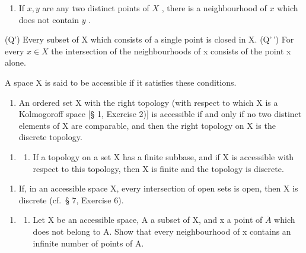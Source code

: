 \begin{enumerate}
\def\labelenumi{(\Alph{enumi})}
\setcounter{enumi}{16}
\tightlist
\item
  If \(x, y\) are any two distinct points of \(X\) , there is a neighbourhood of \(x\) which does not contain \(y\) .
\end{enumerate}

(Q') Every subset of X which consists of a single point is closed in X. (Q'\,') For every \(x \in X\) the intersection of the neighbourhoods of x consists of the point x alone.

A space X is said to be accessible if it satisfies these conditions.

\begin{enumerate}
\def\labelenumi{\alph{enumi})}
\setcounter{enumi}{1}
\tightlist
\item
  An ordered set X with the right topology (with respect to which X is a Kolmogoroff space {[}§ 1, Exercise 2){]} is accessible if and only if no two distinct elements of X are comparable, and then the right topology on X is the discrete topology.
\end{enumerate}

\begin{enumerate}
\def\labelenumi{\arabic{enumi})}
\setcounter{enumi}{1}
\tightlist
\item
  \begin{enumerate}
  \def\labelenumii{\alph{enumii})}
  \tightlist
  \item
    If a topology on a set X has a finite subbase, and if X is accessible with respect to this topology, then X is finite and the topology is discrete.
  \end{enumerate}
\end{enumerate}

\begin{enumerate}
\def\labelenumi{\alph{enumi})}
\setcounter{enumi}{1}
\tightlist
\item
  If, in an accessible space X, every intersection of open sets is open, then X is discrete (cf.~§ 7, Exercise 6).
\end{enumerate}

\begin{enumerate}
\def\labelenumi{\arabic{enumi})}
\setcounter{enumi}{2}
\tightlist
\item
  \begin{enumerate}
  \def\labelenumii{\alph{enumii})}
  \tightlist
  \item
    Let X be an accessible space, A a subset of X, and x a point of \(\overline{A}\) which does not belong to A. Show that every neighbourhood of x contains an infinite number of points of A.
  \end{enumerate}
\end{enumerate}

